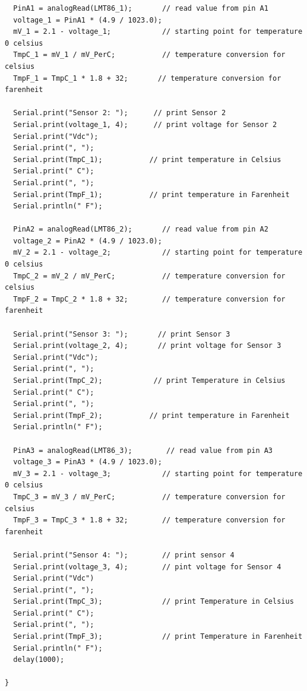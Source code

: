 \documentclass[12pt,a4paper]{report}
\begin{document}
\begin{lstlisting}
  PinA1 = analogRead(LMT86_1);       // read value from pin A1
  voltage_1 = PinA1 * (4.9 / 1023.0);
  mV_1 = 2.1 - voltage_1;            // starting point for temperature 0 celsius 
  TmpC_1 = mV_1 / mV_PerC;           // temperature conversion for celsius
  TmpF_1 = TmpC_1 * 1.8 + 32;       // temperature conversion for farenheit 

  Serial.print("Sensor 2: ");      // print Sensor 2
  Serial.print(voltage_1, 4);      // print voltage for Sensor 2
  Serial.print("Vdc");
  Serial.print(", ");
  Serial.print(TmpC_1);           // print temperature in Celsius 
  Serial.print(" C");
  Serial.print(", ");
  Serial.print(TmpF_1);           // print temperature in Farenheit 
  Serial.println(" F");

  PinA2 = analogRead(LMT86_2);       // read value from pin A2
  voltage_2 = PinA2 * (4.9 / 1023.0); 
  mV_2 = 2.1 - voltage_2;            // starting point for temperature 0 celsius
  TmpC_2 = mV_2 / mV_PerC;           // temperature conversion for celsius
  TmpF_2 = TmpC_2 * 1.8 + 32;        // temperature conversion for farenheit

  Serial.print("Sensor 3: ");       // print Sensor 3
  Serial.print(voltage_2, 4);       // print voltage for Sensor 3
  Serial.print("Vdc");
  Serial.print(", ");
  Serial.print(TmpC_2);            // print Temperature in Celsius
  Serial.print(" C");
  Serial.print(", ");
  Serial.print(TmpF_2);           // print temperature in Farenheit
  Serial.println(" F");

  PinA3 = analogRead(LMT86_3);        // read value from pin A3
  voltage_3 = PinA3 * (4.9 / 1023.0);
  mV_3 = 2.1 - voltage_3;            // starting point for temperature 0 celsius
  TmpC_3 = mV_3 / mV_PerC;           // temperature conversion for celsius
  TmpF_3 = TmpC_3 * 1.8 + 32;        // temperature conversion for farenheit

  Serial.print("Sensor 4: ");        // print sensor 4 
  Serial.print(voltage_3, 4);        // pint voltage for Sensor 4
  Serial.print("Vdc")
  Serial.print(", ");
  Serial.print(TmpC_3);              // print Temperature in Celsius 
  Serial.print(" C");
  Serial.print(", ");
  Serial.print(TmpF_3);              // print Temperature in Farenheit
  Serial.println(" F");
  delay(1000);

}
\end{lstlisting}  
\end{document}
